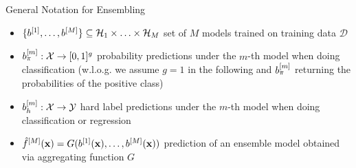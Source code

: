 \documentclass[11pt,compress,t,notes=noshow, aspectratio=169, xcolor=table]{beamer}
\begin{document}

\begin{vbframe}{General Notation for Ensembling}
\begin{itemize}
    \item $\{b^{[1]}, \ldots, b^{[M]}\} \subseteq \mathcal{H}_{1} \times \ldots \times \mathcal{H}_{M}$ set of $M$ models trained on training data $\mathcal{D}$
    \item $b_{\pi}^{[m]}: \mathcal{X} \rightarrow [0, 1]^{g}$ probability predictions under the $m$-th model when doing classification (w.l.o.g. we assume $g = 1$ in the following and $b_{\pi}^{[m]}$ returning the probabilities of the positive class)
    \item $b_{h}^{[m]}: \mathcal{X} \rightarrow \mathcal{Y}$ hard label predictions under the $m$-th model when doing classification or regression
    \item $\hat{f}^{[M]}(\mathbf{x}) = G(b^{[1]}(\mathbf{x}), \ldots, b^{[M]}(\mathbf{x}))$ prediction of an ensemble model obtained via aggregating function $G$
\end{itemize}
\end{vbframe}
\end{document}
